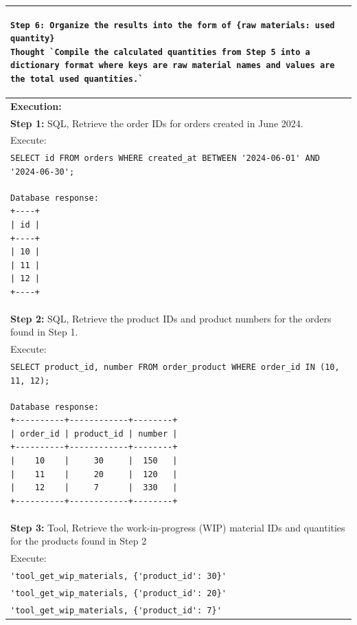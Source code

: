 \documentclass[preprint,12pt]{elsarticle}
\begin{document}
\begin{center}
\begin{longtable}{p{390pt}}
\begin{lstlisting}[style=my_operation, label={lst:chain_of_operation}]
Step 6: Organize the results into the form of {raw materials: used quantity}
Thought `Compile the calculated quantities from Step 5 into a dictionary format where keys are raw material names and values are the total used quantities.`
\end{lstlisting}\\ \hline

\hline
\textbf{Execution:}\\
\textbf{Step 1:} SQL, Retrieve the order IDs for orders created in June 2024.\\
Execute:\\
\lstinline!SELECT id FROM orders WHERE created_at BETWEEN '2024-06-01' AND '2024-06-30';! \\
\begin{lstlisting}[style=sql_command]
Database response:
+----+
| id |
+----+
| 10 |
| 11 |
| 12 |
+----+
\end{lstlisting}\\ \hline
\textbf{Step 2:} SQL, Retrieve the product IDs and product numbers for the orders found in Step 1.\\
Execute:\\
\lstinline!SELECT product_id, number FROM order_product WHERE order_id IN (10, 11, 12);! \\
\begin{lstlisting}[style=sql_command]
Database response:
+----------+------------+--------+
| order_id | product_id | number |
+----------+------------+--------+
|    10    |     30     |  150   |
|    11    |     20     |  120   |
|    12    |     7      |  330   |
+----------+------------+--------+
\end{lstlisting}\\ \hline
\textbf{Step 3:} Tool, Retrieve the work-in-progress (WIP) material IDs and quantities for the products found in Step 2\\
Execute:\\
\lstinline!'tool_get_wip_materials, {'product_id': 30}'!\\
\lstinline!'tool_get_wip_materials, {'product_id': 20}'!\\
\lstinline!'tool_get_wip_materials, {'product_id': 7}'!\\


\end{longtable}
\end{center}
\end{document}
